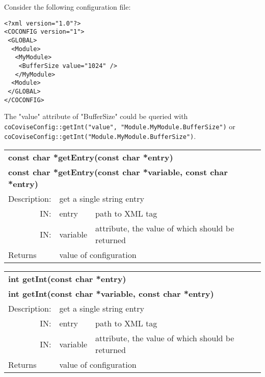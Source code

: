 Consider the following configuration file:
\begin{verbatim}
<?xml version="1.0"?>
<COCONFIG version="1">
 <GLOBAL>
  <Module>
   <MyModule>
    <BufferSize value="1024" />
   </MyModule>
  <Module>
 </GLOBAL>
</COCONFIG>
\end{verbatim}
The "value" attribute of "BufferSize" could be queried with
{\tt coCoviseConfig::getInt("value", "Module.MyModule.BufferSize")} or
{\tt coCoviseConfig::getInt("Module.MyModule.BufferSize")}.

  
\begin{longtable}{|p{4cm}|p{2.5cm}|p{7cm}|}
\hline
\multicolumn{3}{|p{13.5cm}|}{\bf const char *getEntry(const char *entry)} \\
\multicolumn{3}{|p{13.5cm}|}{\bf const char *getEntry(const char *variable, const char *entry)} \\
\hline
{Description:}   
              & \multicolumn{2}{|p{9.5cm}|}{get a single string entry} \\                     
\hline
\multicolumn{1}{|r|}{IN:} & {entry} 
                             & {path to XML tag }\\
\hline
\multicolumn{1}{|r|}{IN:} & {variable} 
                             & {attribute, the value of which should be returned}\\
\hline
{Returns}  
                        & \multicolumn{2}{|p{9.5cm}|}{value of configuration} \endhead
\hline
\end{longtable}


\begin{longtable}{|p{4cm}|p{2.5cm}|p{7cm}|}
\hline
\multicolumn{3}{|p{13.5cm}|}{\bf int getInt(const char *entry)} \\
\multicolumn{3}{|p{13.5cm}|}{\bf int getInt(const char *variable, const char *entry)} \\
\hline
{Description:}   
              & \multicolumn{2}{|p{9.5cm}|}{get a single string entry} \\                     
\hline
\multicolumn{1}{|r|}{IN:} & {entry} 
                             & {path to XML tag }\\
\hline
\multicolumn{1}{|r|}{IN:} & {variable} 
                             & {attribute, the value of which should be returned}\\
\hline
{Returns}  
                        & \multicolumn{2}{|p{9.5cm}|}{value of configuration} \endhead
\hline
\end{longtable}


